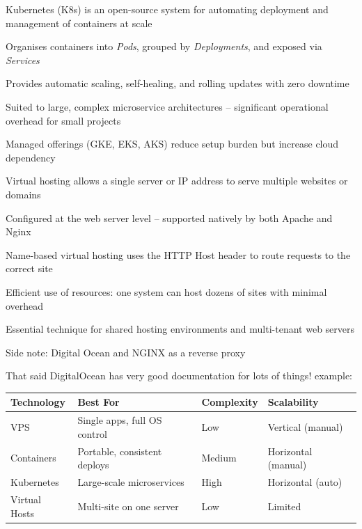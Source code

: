 \documentclass[Screen16to9,17pt]{foils}
\begin{document}

\begin{list2}
\item Kubernetes (K8s) is an open-source system for automating deployment and management of containers at scale
\item Organises containers into \textit{Pods}, grouped by \textit{Deployments}, and exposed via \textit{Services}
\item Provides automatic scaling, self-healing, and rolling updates with zero downtime
\item Suited to large, complex microservice architectures -- significant operational overhead for small projects
\item Managed offerings (GKE, EKS, AKS) reduce setup burden but increase cloud dependency
\end{list2}


\begin{list2}
\item Virtual hosting allows a single server or IP address to serve multiple websites or domains
\item Configured at the web server level -- supported natively by both Apache and Nginx
\item Name-based virtual hosting uses the HTTP Host header to route requests to the correct site
\item Efficient use of resources: one system can host dozens of sites with minimal overhead
\item Essential technique for shared hosting environments and multi-tenant web servers
\end{list2}

Side note: Digital Ocean and NGINX as a reverse proxy

That said DigitalOcean has very good documentation for lots of things! example:\\


\begin{center}
\begin{tabular}{|l|l|l|l|}
\hline
{\bf Technology} & {\bf Best For} & {\bf Complexity} & {\bf Scalability} \\
\hline
VPS              & Single apps, full OS control   & Low    & Vertical (manual)   \\
Containers       & Portable, consistent deploys   & Medium & Horizontal (manual) \\
Kubernetes       & Large-scale microservices      & High   & Horizontal (auto)   \\
Virtual Hosts    & Multi-site on one server       & Low    & Limited             \\
\hline
\end{tabular}
\end{center}
\end{document}

